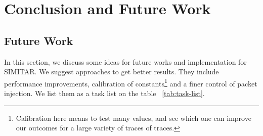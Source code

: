 \chapter{Conclusion and Future Work}\label{ch:conclusion}


\section{Future Work}

In this section, we discuss some ideas for future works and implementation for SIMITAR. We suggest approaches to get better results. They include performance improvements, calibration of constants\footnote{Calibration here means to test many values, and see which one can improve our outcomes for a large variety of traces of traces.} and a finer control of packet injection. We list them as a task list on the table ~\ref{tab:task-list}.  



